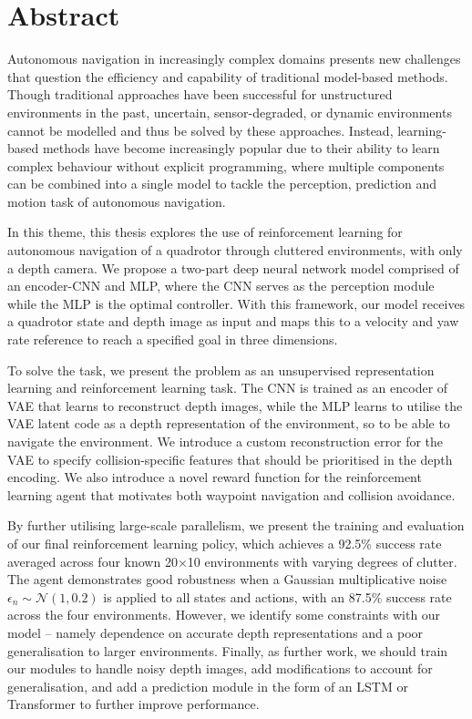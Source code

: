 \chapter*{Abstract}
\begin{comment}
A condensation of the essential information of the article.
\end{comment}

Autonomous navigation in increasingly complex domains presents new challenges that question the efficiency and capability of traditional model-based methods. Though traditional approaches have been successful for unstructured environments in the past, uncertain, sensor-degraded, or dynamic environments cannot be modelled and thus be solved by these approaches. Instead, learning-based methods have become increasingly popular due to their ability to learn complex behaviour without explicit programming, where multiple components can be combined into a single model to tackle the perception, prediction and motion task of autonomous navigation.

In this theme, this thesis explores the use of reinforcement learning for autonomous navigation of a quadrotor through cluttered environments, with only a depth camera. We propose a two-part deep neural network model comprised of an encoder-CNN and MLP, where the CNN serves as the perception module while the MLP is the optimal controller. With this framework, our model receives a quadrotor state and depth image as input and maps this to a velocity and yaw rate reference to reach a specified goal in three dimensions.

To solve the task, we present the problem as an unsupervised representation learning and reinforcement learning task. The CNN is trained as an encoder of VAE that learns to reconstruct depth images, while the MLP learns to utilise the VAE latent code as a depth representation of the environment, so to be able to navigate the environment. We introduce a custom reconstruction error for the VAE to specify collision-specific features that should be prioritised in the depth encoding. We also introduce a novel reward function for the reinforcement learning agent that motivates both waypoint navigation and collision avoidance.

By further utilising large-scale parallelism, we present the training and evaluation of our final reinforcement learning policy, which achieves a 92.5\% success rate averaged across four known 20$\times$10 environments with varying degrees of clutter. The agent demonstrates good robustness when a Gaussian multiplicative noise $\epsilon_n \sim \mathcal{N}(1, 0.2)$ is applied to all states and actions, with an 87.5\% success rate across the four environments. However, we identify some constraints with our model -- namely dependence on accurate depth representations and a poor generalisation to larger environments. Finally, as further work, we should train our modules to handle noisy depth images, add modifications to account for generalisation, and add a prediction module in the form of an LSTM or Transformer to further improve performance.